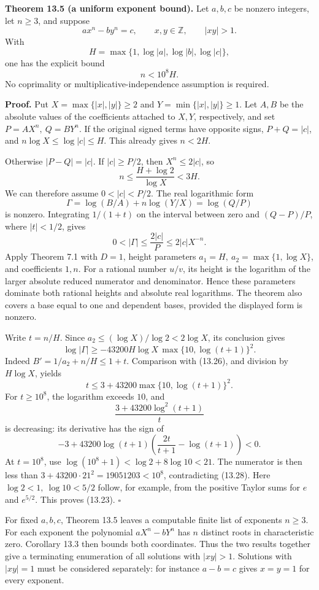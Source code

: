 \documentclass[
  11pt,
  a4paper,
]{article}
\begin{document}
\textbf{Theorem 13.5 (a uniform exponent bound).} Let \(a,b,c\) be
nonzero integers, let \(n\ge3\), and suppose \[
ax^n-by^n=c,\qquad x,y\in\mathbb Z,\qquad |xy|>1.
\tag{13.22}
\] With \[
H=\max\{1,\log|a|,\log|b|,\log|c|\},
\] one has the explicit bound \[
n<10^8H.
\tag{13.23}
\] No coprimality or multiplicative-independence assumption is required.

\textbf{Proof.} Put \(X=\max\{|x|,|y|\}\ge2\) and
\(Y=\min\{|x|,|y|\}\ge1\). Let \(A,B\) be the absolute values of the
coefficients attached to \(X,Y\), respectively, and set
\(P=AX^n,\ Q=BY^n\). If the original signed terms have opposite signs,
\(P+Q=|c|\), and \(n\log X\le\log|c|\le H\). This already gives
\(n<2H\).

Otherwise \(|P-Q|=|c|\). If \(|c|\ge P/2\), then \(X^n\le2|c|\), so \[
n\le\frac{H+\log2}{\log X}<3H.
\tag{13.24}
\] We can therefore assume \(0<|c|<P/2\). The real logarithmic form \[
\Gamma=\log(B/A)+n\log(Y/X)=\log(Q/P)
\tag{13.25}
\] is nonzero. Integrating \(1/(1+t)\) on the interval between zero and
\((Q-P)/P\), where \(|t|<1/2\), gives \[
0<|\Gamma|\le\frac{2|c|}{P}\le2|c|X^{-n}.
\tag{13.26}
\] Apply Theorem 7.1 with \(D=1\), height parameters
\(a_1=H,\ a_2=\max\{1,\log X\}\), and coefficients \(1,n\). For a
rational number \(u/v\), its height is the logarithm of the larger
absolute reduced numerator and denominator. Hence these parameters
dominate both rational heights and absolute real logarithms. The theorem
also covers a base equal to one and dependent bases, provided the
displayed form is nonzero.

Write \(t=n/H\). Since \(a_2\le(\log X)/\log2<2\log X\), its conclusion
gives \[
\log|\Gamma|\ge
-43200H\log X\,\max\{10,\log(t+1)\}^2.
\tag{13.27}
\] Indeed \(B'=1/a_2+n/H\le1+t\). Comparison with (13.26), and division
by \(H\log X\), yields \[
t\le3+43200\max\{10,\log(t+1)\}^2.
\tag{13.28}
\] For \(t\ge10^8\), the logarithm exceeds \(10\), and \[
\frac{3+43200\log^2(t+1)}{t}
\] is decreasing: its derivative has the sign of \[
-3+43200\log(t+1)
 \left(\frac{2t}{t+1}-\log(t+1)\right)<0.
\] At \(t=10^8\), use \(\log(10^8+1)<\log2+8\log10<21\). The numerator
is then less than \(3+43200\cdot21^2=19051203<10^8\), contradicting
(13.28). Here \(\log2<1,\ \log10<5/2\) follow, for example, from the
positive Taylor sums for \(e\) and \(e^{5/2}\). This proves (13.23).
\(\square\)

For fixed \(a,b,c\), Theorem 13.5 leaves a computable finite list of
exponents \(n\ge3\). For each exponent the polynomial \(aX^n-bY^n\) has
\(n\) distinct roots in characteristic zero. Corollary 13.3 then bounds
both coordinates. Thus the two results together give a terminating
enumeration of all solutions with \(|xy|>1\). Solutions with \(|xy|=1\)
must be considered separately: for instance \(a-b=c\) gives \(x=y=1\)
for every exponent.
\end{document}
